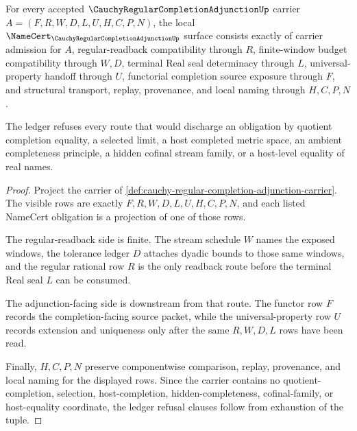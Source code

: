 \begin{theorem}
\label{thm:cauchy-regular-completion-adjunction-namecert-obligations}
For every accepted $\CauchyRegularCompletionAdjunctionUp$ carrier $A=(F,R,W,D,L,U,H,C,P,N)$, the local $\NameCert_{\CauchyRegularCompletionAdjunctionUp}$ surface consists exactly of carrier admission for $A$, regular-readback compatibility through $R$, finite-window budget compatibility through $W,D$, terminal Real seal determinacy through $L$, universal-property handoff through $U$, functorial completion source exposure through $F$, and structural transport, replay, provenance, and local naming through $H,C,P,N$.

The ledger refuses every route that would discharge an obligation by quotient completion equality, a selected limit, a host completed metric space, an ambient completeness principle, a hidden cofinal stream family, or a host-level equality of real names.
\end{theorem}
\begin{proof}
Project the carrier of \autoref{def:cauchy-regular-completion-adjunction-carrier}. The visible rows are exactly $F,R,W,D,L,U,H,C,P,N$, and each listed NameCert obligation is a projection of one of those rows.

The regular-readback side is finite. The stream schedule $W$ names the exposed windows, the tolerance ledger $D$ attaches dyadic bounds to those same windows, and the regular rational row $R$ is the only readback route before the terminal Real seal $L$ can be consumed.

The adjunction-facing side is downstream from that route. The functor row $F$ records the completion-facing source packet, while the universal-property row $U$ records extension and uniqueness only after the same $R,W,D,L$ rows have been read.

Finally, $H,C,P,N$ preserve componentwise comparison, replay, provenance, and local naming for the displayed rows. Since the carrier contains no quotient-completion, selection, host-completion, hidden-completeness, cofinal-family, or host-equality coordinate, the ledger refusal clauses follow from exhaustion of the tuple.
\end{proof}

